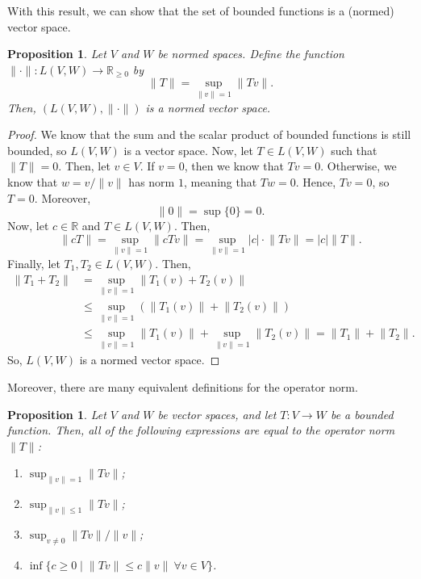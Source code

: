 \documentclass[a4paper, openany]{memoir}
\theoremstyle{definition}
\theoremstyle{plain}
\newtheorem{proposition}[definition]{Proposition}
\begin{document}
    With this result, we can show that the set of bounded functions is a (normed) vector space.
    \begin{proposition}
        Let $V$ and $W$ be normed spaces. Define the function $\lVert \cdot \rVert \colon L(V, W) \to \mathbb{R}_{\geq 0}$ by 
        \[\lVert T \rVert = \sup_{\lVert v \rVert = 1} \lVert Tv \rVert.\]
        Then, $(L(V, W), \lVert \cdot \rVert)$ is a normed vector space.
    \end{proposition}
    \begin{proof}
        We know that the sum and the scalar product of bounded functions is still bounded, so $L(V, W)$ is a vector space. Now, let $T \in L(V, W)$ such that $\lVert T \rVert = 0$. Then, let $v \in V$. If $v = 0$, then we know that $Tv = 0$. Otherwise, we know that $w = v/\lVert v \rVert$ has norm $1$, meaning that $Tw = 0$. Hence, $Tv = 0$, so $T = 0$. Moreover, 
        \[\lVert 0 \rVert = \sup \{0\} = 0.\]
        Now, let $c \in \mathbb{R}$ and $T \in L(V, W)$. Then,
        \[\lVert cT \rVert = \sup_{\lVert v \rVert = 1} \lVert cTv \rVert = \sup_{\lVert v \rVert = 1} |c| \cdot \lVert Tv \rVert = |c| \lVert T \rVert.\]
        Finally, let $T_1, T_2 \in L(V, W)$. Then,
        \begin{align*}
            \lVert T_1 + T_2 \rVert &= \sup_{\lVert v \rVert = 1} \lVert T_1(v) + T_2(v) \rVert \\
            &\leq \sup_{\lVert v \rVert = 1} (\lVert T_1(v) \rVert + \lVert T_2(v) \rVert) \\
            &\leq \sup_{\lVert v \rVert = 1} \lVert T_1(v) \rVert + \sup_{\lVert v \rVert = 1} \lVert T_2(v) \rVert = \lVert T_1 \rVert + \lVert T_2 \rVert.
        \end{align*}
        So, $L(V, W)$ is a normed vector space.
    \end{proof}
    \noindent Moreover, there are many equivalent definitions for the operator norm.
    \begin{proposition}
        Let $V$ and $W$ be vector spaces, and let $T \colon V \to W$ be a bounded function. Then, all of the following expressions are equal to the operator norm $\lVert T \rVert$:
        \begin{enumerate}
            \item $\sup_{\lVert v \rVert = 1} \lVert Tv \rVert$;
            \item $\sup_{\lVert v \rVert \leq 1} \lVert Tv \rVert$;
            \item $\sup_{v \neq 0} \lVert Tv \rVert/\lVert v \rVert$;
            \item $\inf \{c \geq 0 \mid \lVert Tv \rVert \leq c \lVert v \rVert \ \forall v \in V\}$.
        \end{enumerate}
    \end{proposition}
\end{document}
